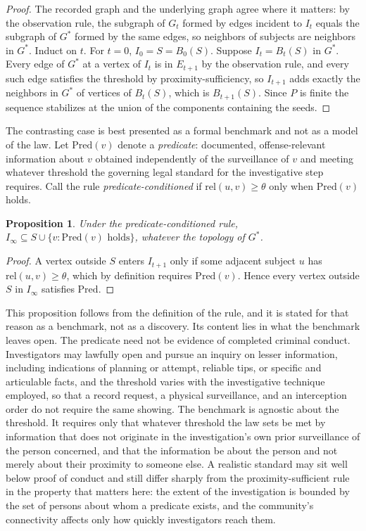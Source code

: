 \documentclass[11pt]{article}
\newtheorem{proposition}{Proposition}
\theoremstyle{definition}
\theoremstyle{remark}
\begin{document}
\begin{proof}
The recorded graph and the underlying graph agree where it matters: by the observation rule, the subgraph of $G_t$ formed by edges incident to $I_t$ equals the subgraph of $G^{\ast}$ formed by the same edges, so neighbors of subjects are neighbors in $G^{\ast}$. Induct on $t$. For $t = 0$, $I_0 = S = B_0(S)$. Suppose $I_t = B_t(S)$ in $G^{\ast}$. Every edge of $G^{\ast}$ at a vertex of $I_t$ is in $E_{t+1}$ by the observation rule, and every such edge satisfies the threshold by proximity-sufficiency, so $I_{t+1}$ adds exactly the neighbors in $G^{\ast}$ of vertices of $B_t(S)$, which is $B_{t+1}(S)$. Since $P$ is finite the sequence stabilizes at the union of the components containing the seeds.
\end{proof}

The contrasting case is best presented as a formal benchmark and not as a model of the law. Let $\mathrm{Pred}(v)$ denote a \emph{predicate}: documented, offense-relevant information about $v$ obtained independently of the surveillance of $v$ and meeting whatever threshold the governing legal standard for the investigative step requires. Call the rule \emph{predicate-conditioned} if $\mathrm{rel}(u,v) \ge \theta$ only when $\mathrm{Pred}(v)$ holds.

\begin{proposition}
Under the predicate-conditioned rule, $I_\infty \subseteq S \cup \{ v : \mathrm{Pred}(v) \text{ holds} \}$, whatever the topology of $G^{\ast}$.
\end{proposition}

\begin{proof}
A vertex outside $S$ enters $I_{t+1}$ only if some adjacent subject $u$ has $\mathrm{rel}(u,v) \ge \theta$, which by definition requires $\mathrm{Pred}(v)$. Hence every vertex outside $S$ in $I_\infty$ satisfies $\mathrm{Pred}$.
\end{proof}

This proposition follows from the definition of the rule, and it is stated for that reason as a benchmark, not as a discovery. Its content lies in what the benchmark leaves open. The predicate need not be evidence of completed criminal conduct. Investigators may lawfully open and pursue an inquiry on lesser information, including indications of planning or attempt, reliable tips, or specific and articulable facts, and the threshold varies with the investigative technique employed, so that a record request, a physical surveillance, and an interception order do not require the same showing. The benchmark is agnostic about the threshold. It requires only that whatever threshold the law sets be met by information that does not originate in the investigation's own prior surveillance of the person concerned, and that the information be about the person and not merely about their proximity to someone else. A realistic standard may sit well below proof of conduct and still differ sharply from the proximity-sufficient rule in the property that matters here: the extent of the investigation is bounded by the set of persons about whom a predicate exists, and the community's connectivity affects only how quickly investigators reach them.
\end{document}
